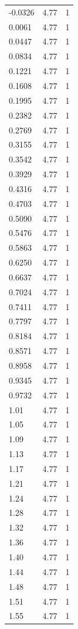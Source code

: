 \begin{longtable}{lrr}
  -0.0326 & 4.77 & 1 \\
  0.0061 & 4.77 & 1 \\
  0.0447 & 4.77 & 1 \\
  0.0834 & 4.77 & 1 \\
  0.1221 & 4.77 & 1 \\
  0.1608 & 4.77 & 1 \\
  0.1995 & 4.77 & 1 \\
  0.2382 & 4.77 & 1 \\
  0.2769 & 4.77 & 1 \\
  0.3155 & 4.77 & 1 \\
  0.3542 & 4.77 & 1 \\
  0.3929 & 4.77 & 1 \\
  0.4316 & 4.77 & 1 \\
  0.4703 & 4.77 & 1 \\
  0.5090 & 4.77 & 1 \\
  0.5476 & 4.77 & 1 \\
  0.5863 & 4.77 & 1 \\
  0.6250 & 4.77 & 1 \\
  0.6637 & 4.77 & 1 \\
  0.7024 & 4.77 & 1 \\
  0.7411 & 4.77 & 1 \\
  0.7797 & 4.77 & 1 \\
  0.8184 & 4.77 & 1 \\
  0.8571 & 4.77 & 1 \\
  0.8958 & 4.77 & 1 \\
  0.9345 & 4.77 & 1 \\
  0.9732 & 4.77 & 1 \\
  1.01 & 4.77 & 1 \\
  1.05 & 4.77 & 1 \\
  1.09 & 4.77 & 1 \\
  1.13 & 4.77 & 1 \\
  1.17 & 4.77 & 1 \\
  1.21 & 4.77 & 1 \\
  1.24 & 4.77 & 1 \\
  1.28 & 4.77 & 1 \\
  1.32 & 4.77 & 1 \\
  1.36 & 4.77 & 1 \\
  1.40 & 4.77 & 1 \\
  1.44 & 4.77 & 1 \\
  1.48 & 4.77 & 1 \\
  1.51 & 4.77 & 1 \\
  1.55 & 4.77 & 1 \\

\end{longtable}
